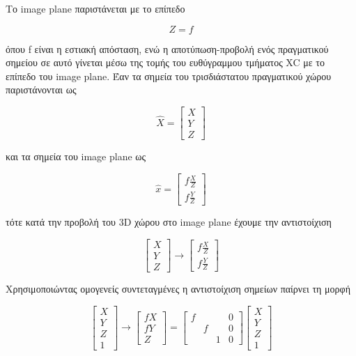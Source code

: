 Το image plane παριστάνεται με το επίπεδο 

\begin{equation}
 Z = f
\end{equation}

όπου f είναι η εστιακή απόσταση, ενώ η αποτύπωση-προβολή ενός πραγματικού σημείου σε αυτό γίνεται μέσω της τομής του ευθύγραμμου τμήματος XC με το επίπεδο του image plane.
Έαν τα σημεία του τρισδιάστατου πραγματικού χώρου παριστάνονται ως 

\begin{equation}
\hat{X}=
\begin{bmatrix}
X\\ 
Y\\ 
Z
\end{bmatrix}
\end{equation}

και τα σημεία του image plane ως


\begin{equation}
\hat{x}=
\begin{bmatrix}
f\frac{X}{Z}\\ 
f\frac{Y}{Z}
\end{bmatrix}
\end{equation}

τότε κατά την προβολή του 3D χώρου στο image plane έχουμε την αντιστοίχιση 


\begin{equation}
\begin{bmatrix}
X\\ 
Y\\ 
Z
\end{bmatrix}
\rightarrow
\begin{bmatrix}
f\frac{X}{Z}\\ 
f\frac{Y}{Z}
\end{bmatrix}
\end{equation}

Χρησιμοποιώντας ομογενείς συντεταγμένες η αντιστοίχιση σημείων παίρνει τη μορφή 

\begin{equation}
\begin{bmatrix}
X\\ 
Y\\ 
Z\\
1
\end{bmatrix}
\rightarrow
\begin{bmatrix}
fX\\ 
fY\\
Ζ
\end{bmatrix}
=
\begin{bmatrix}
f &  &  & 0\\ 
 & f & & 0\\
 & & 1 & 0
\end{bmatrix}
\begin{bmatrix}
X\\ 
Y\\
Z\\
1
\end{bmatrix}
\end{equation}

